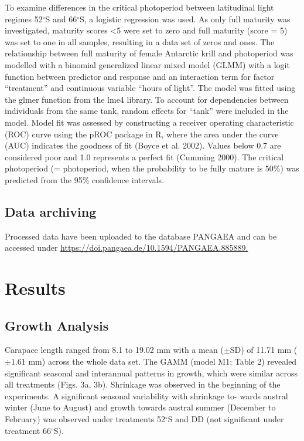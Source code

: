To examine differences in the critical photoperiod between latitudinal light
regimes 52$^{\circ}$S and 66$^{\circ}$S, a logistic regression was used. As
only full maturity was investigated, maturity scores <5 were set to zero and
full maturity (score = 5) was set to one in all samples, resulting in a data
set of zeros and ones. The relationship between full maturity of female
Antarctic krill and photoperiod was modelled with a binomial generalized linear
mixed model (GLMM) with a logit function between predictor and response and an
interaction term for factor “treatment” and continuous variable “hours of
light”. The model was fitted using the glmer function from the lme4 library. To
account for dependencies between individuals from the same tank, random effects
for “tank” were included in the model. Model fit was assessed by constructing a
receiver operating characteristic (ROC) curve using the pROC package in R,
where the area under the curve (AUC) indicates the goodness of fit (Boyce et
al. 2002). Values below 0.7 are considered poor and 1.0 represents a perfect
fit (Cumming 2000). The critical photoperiod (= photoperiod, when the
probability to be fully mature is 50\%) was predicted from the 95\% confidence
intervals.

\subsection{Data archiving} 

Processed data have been uploaded to the database PANGAEA and can be accessed
under \url{https://doi.pangaea.de/10.1594/PANGAEA.885889.}

\section{Results}

\subsection{Growth Analysis} 

Carapace length ranged from 8.1 to 19.02 mm with a mean ($\pm$SD) of 11.71 mm
($\pm$1.61 mm) across the whole data set. The GAMM (model M1; Table 2) revealed
significant seasonal and interannual patterns in growth, which were similar
across all treatments (Figs. 3a, 3b). Shrinkage was observed in the beginning
of the experiments. A significant seasonal variability with shrinkage to- wards
austral winter (June to August) and growth towards austral summer (December to
February) was observed under treatments 52$^{\circ}$S and DD (not significant
under treatment 66$^{\circ}$S).

